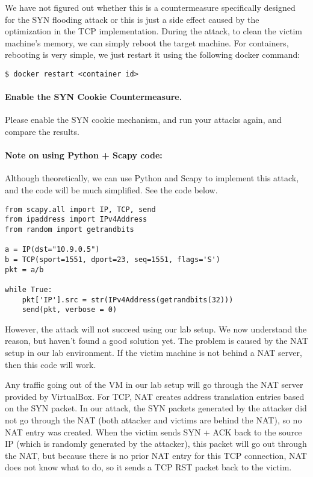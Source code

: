We have not figured out whether this is a countermeasure specifically designed
for the SYN flooding attack or this is just a side effect caused by
the optimization in the TCP implementation. During the attack, 
to clean the victim machine's memory, 
we can simply reboot the target machine.
For containers, rebooting is very simple, we 
just restart it using the following docker command:

\begin{lstlisting}
$ docker restart <container id>
\end{lstlisting}
 



\paragraph{Enable the SYN Cookie Countermeasure.}
Please enable the SYN cookie mechanism, and 
run your attacks again, and compare the results. 



\paragraph{Note on using Python + Scapy code:} 
Although theoretically, we can use Python and Scapy to implement this attack,
and the code will be much simplified. See the code below. 

\begin{lstlisting}
from scapy.all import IP, TCP, send
from ipaddress import IPv4Address
from random import getrandbits

a = IP(dst="10.9.0.5")
b = TCP(sport=1551, dport=23, seq=1551, flags='S')
pkt = a/b

while True:
    pkt['IP'].src = str(IPv4Address(getrandbits(32)))
    send(pkt, verbose = 0)
\end{lstlisting}


However, the attack will not succeed using our lab setup. We now understand
the reason, but haven't found a good solution yet. The problem is caused by
the NAT setup in our lab environment. If the victim machine is not 
behind a NAT server, then this code will work.


Any traffic going out of the VM in our lab setup will go through the NAT server
provided by VirtualBox. For TCP, NAT creates address translation 
entries based on the SYN packet. 
In our attack, the SYN packets generated 
by the attacker did not go through the NAT (both attacker and victims are behind the 
NAT), so no NAT entry was created. When the victim sends SYN + ACK back to the
source IP (which is randomly generated by the attacker), this packet will 
go out through the NAT, but because there is no prior NAT entry
for this TCP connection, NAT does not know what to do,
so it sends a TCP RST packet back to the victim. 

